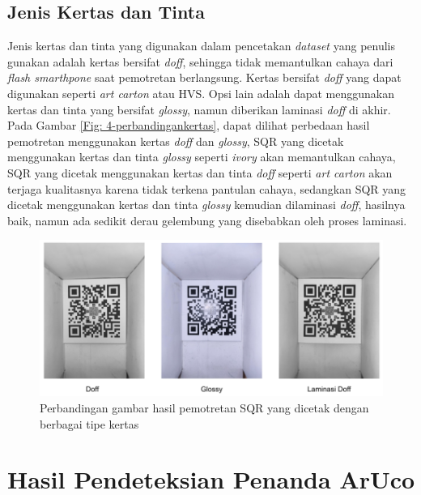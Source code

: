 \subsection{Jenis Kertas dan Tinta}
Jenis kertas dan tinta yang digunakan dalam pencetakan \emph{dataset} yang penulis gunakan adalah kertas bersifat \emph{doff}, sehingga tidak memantulkan
cahaya dari \emph{flash smarthpone} saat pemotretan berlangsung. Kertas bersifat \emph{doff} yang dapat digunakan seperti \emph{art carton} atau HVS. Opsi lain
adalah dapat menggunakan kertas dan tinta yang bersifat \emph{glossy}, namun diberikan laminasi \emph{doff} di akhir. Pada Gambar \ref{Fig:
	4-perbandingankertas}, dapat dilihat perbedaan hasil pemotretan menggunakan kertas \emph{doff} dan \emph{glossy}, SQR yang dicetak menggunakan kertas dan tinta
\emph{glossy} seperti \emph{ivory} akan memantulkan cahaya, SQR yang dicetak menggunakan kertas dan tinta \emph{doff} seperti \emph{art carton} akan terjaga
kualitasnya karena tidak terkena pantulan cahaya, sedangkan SQR yang dicetak menggunakan kertas dan tinta \emph{glossy} kemudian dilaminasi \emph{doff},
hasilnya baik, namun ada sedikit derau gelembung yang disebabkan oleh proses laminasi.

\begin{figure}[h]
	\centering
	\includegraphics[width=15cm]{contents/chapter-4/4-perbandingankertas.png}
	\caption{Perbandingan gambar hasil pemotretan SQR yang dicetak dengan berbagai tipe kertas}
	\label{Fig: 4-perbandingankertas}
\end{figure}

\section{Hasil Pendeteksian Penanda ArUco}

